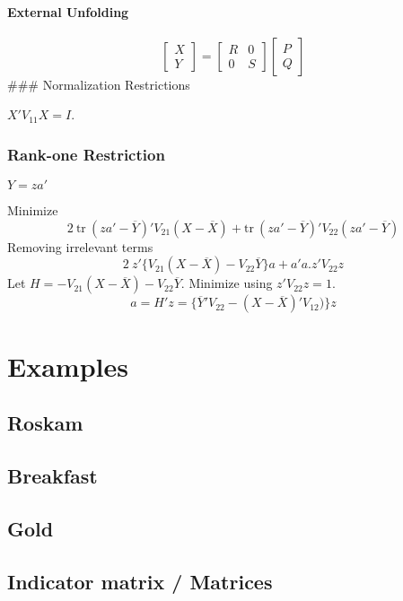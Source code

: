 \documentclass[
  12pt,
]{article}
\begin{document}
\paragraph{External Unfolding}\label{external-unfolding}

\[
\begin{bmatrix}
X\\Y
\end{bmatrix}=
\begin{bmatrix}
R&0\\
0&S
\end{bmatrix}
\begin{bmatrix}
P\\
Q
\end{bmatrix}
\]
\#\#\# Normalization Restrictions

\(X'V_{11}X=I\).

\subsubsection{Rank-one Restriction}\label{rank-one-restriction}

\(Y=za'\)

Minimize
\[
2\ \text{tr}\ (za'-\overline{Y})'V_{21}(X-\overline{X})+
\text{tr}\ (za'-\overline{Y})'V_{22}(za'-\overline{Y})
\]
Removing irrelevant terms
\[
2\ z'\{V_{21}(X-\overline{X})-V_{22}\overline{Y}\}a+
a'a.z'V_{22}z
\]
Let \(H=-V_{21}(X-\overline{X})-V_{22}\overline{Y}\). Minimize using \(z'V_{22}z=1\).
\[
a=H'z=\{\overline{Y}'V_{22}-(X-\overline{X})'V_{12})\}z
\]

\section{Examples}\label{examples}

\subsection{Roskam}\label{roskam}

\subsection{Breakfast}\label{breakfast}

\subsection{Gold}\label{gold}

\subsection{Indicator matrix / Matrices}\label{indicator-matrix-matrices}
\end{document}
